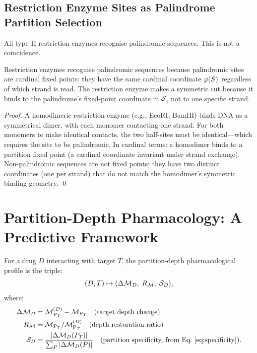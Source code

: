 \subsection{Restriction Enzyme Sites as Palindrome Partition Selection}

All type II restriction enzymes recognise palindromic sequences. This is not
a coincidence.

\begin{proposition}
\label{prop:restriction_palindromes}
Restriction enzymes recognise palindromic sequences because palindromic sites
are cardinal fixed points: they have the same cardinal coordinate $\varphi(S)$
regardless of which strand is read. The restriction enzyme makes a
symmetric cut because it binds to the palindrome's fixed-point coordinate
in $\mathcal{S}$, not to one specific strand.
\end{proposition}

\begin{proof}
A homodimeric restriction enzyme (e.g., EcoRI, BamHI) binds DNA as a symmetrical
dimer, with each monomer contacting one strand. For both monomers to make
identical contacts, the two half-sites must be identical---which requires the
site to be palindromic. In cardinal terms: a homodimer binds to a partition
fixed point (a cardinal coordinate invariant under strand exchange). Non-palindromic
sequences are not fixed points; they have two distinct coordinates (one per
strand) that do not match the homodimer's symmetric binding geometry. \qed
\end{proof}

\section{Partition-Depth Pharmacology: A Predictive Framework}
\label{sec:depth_pharmacology}

\begin{definition}
\label{def:depth_drug}
For a drug $D$ interacting with target $T$, the partition-depth
pharmacological profile is the triple:
\begin{equation}
  (D, T) \mapsto (\Delta\mathcal{M}_D,\; R_{\mathcal{M}},\; \mathcal{S}_D),
\end{equation}
where:
\begin{align}
  \Delta\Depth_D &= \Depth_{\mathrm{P}_T}^{(D)} - \Depth_{\mathrm{P}_T}
                  \quad \text{(target depth change)} \\
  R_\Depth       &= \Depth_{\mathrm{P}_T} / \Depth_{\mathrm{P}_T}^{(D)}
                  \quad \text{(depth restoration ratio)} \\
  \mathcal{S}_D  &= \frac{|\Delta\Depth_D(P_T)|}{\sum_P |\Delta\Depth_D(P)|}
                  \quad \text{(partition specificity, from Eq.\ \eqref{eq:specificity})}.
\end{align}
\end{definition}

